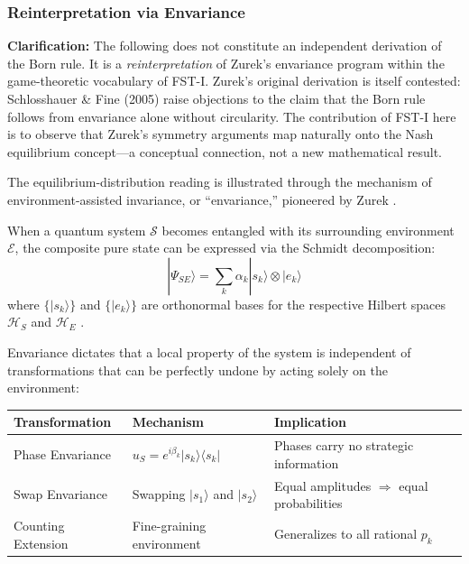 \documentclass[12pt,a4paper]{article}
\theoremstyle{remark}
\begin{document}
\subsubsection{Reinterpretation via Envariance}

\textbf{Clarification:} The following does not constitute an independent derivation of the Born rule. It is a \emph{reinterpretation} of Zurek's envariance program \citep{Zurek2003,Zurek2005} within the game-theoretic vocabulary of FST-I. Zurek's original derivation is itself contested: Schlosshauer \& Fine (2005) \citep{SchlossFine2005} raise objections to the claim that the Born rule follows from envariance alone without circularity. The contribution of FST-I here is to observe that Zurek's symmetry arguments map naturally onto the Nash equilibrium concept---a conceptual connection, not a new mathematical result.

The equilibrium-distribution reading is illustrated through the mechanism of environment-assisted invariance, or ``envariance,'' pioneered by Zurek \citep{Zurek2003,Zurek2005}.

When a quantum system $\mathcal{S}$ becomes entangled with its surrounding environment $\mathcal{E}$, the composite pure state can be expressed via the Schmidt decomposition:
\begin{equation}
|\Psi_{SE}\rangle = \sum_k \alpha_k |s_k\rangle \otimes |e_k\rangle
\end{equation}
where $\{|s_k\rangle\}$ and $\{|e_k\rangle\}$ are orthonormal bases for the respective Hilbert spaces $\mathcal{H}_S$ and $\mathcal{H}_E$ \citep{SchlossFine2005}.

Envariance dictates that a local property of the system is independent of transformations that can be perfectly undone by acting solely on the environment:

\begin{center}
\begin{tabularx}{\textwidth}{@{}>{\raggedright\arraybackslash}p{3.3cm}>{\raggedright\arraybackslash}p{4.1cm}Y@{}}
\toprule
\textbf{Transformation} & \textbf{Mechanism} & \textbf{Implication} \\
\midrule
Phase Envariance & $u_S = e^{i\beta_k}|s_k\rangle\langle s_k|$ & Phases carry no strategic information \\
Swap Envariance & Swapping $|s_1\rangle$ and $|s_2\rangle$ & Equal amplitudes $\Rightarrow$ equal probabilities \\
Counting Extension & Fine-graining environment & Generalizes to all rational $p_k$ \\
\bottomrule
\end{tabularx}
\end{center}
\end{document}
